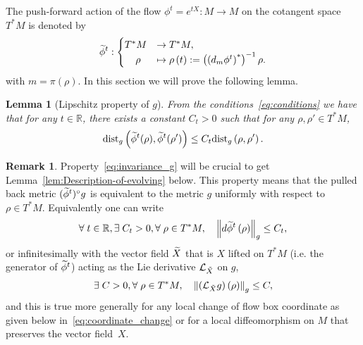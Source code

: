 \documentclass[10pt]{amsart}
\newtheorem{lemm}[theo]{Lemma}\newtheorem{prop}[theo]{Proposition}\newtheorem{coro}[theo]{Corollary}\newtheorem{conj}[theo]{Conjecture}
\theoremstyle{definition}\newtheorem{defi}[theo]{Definition}\newtheorem{rema}[theo]{Remark}\newtheorem{exam}[theo]{Example}\newtheorem{exem}[theo]{Example}\newtheorem{nota}[theo]{Notation}
\newcommand{\clL}{\mathcal{L}}
\newcommand{\dist}{\mathrm{dist}}
\newcommand{\bbR}{\mathbb{R}}
\let\oldtilde\tilde
\renewcommand*{\tilde}[1]{\mathchoice{\widetilde{#1}}{\widetilde{#1}}{\oldtilde{#1}}{\oldtilde{#1}}}
\let\oldexists\exists
\renewcommand*{\exists}{\mathrel{\oldexists}}
\let\oldforall\forall
\renewcommand*{\forall}{\mathrel{\oldforall}}
\begin{document}
The push-forward action of the flow $\phi^{t}=e^{tX}:M\rightarrow M$ on the cotangent space $T^{*}M$ is denoted by
\begin{equation}\label{eq:lifted_flow}
\tilde{\phi}^{t}:
\begin{cases}
T^{*}M & \rightarrow T^{*}M,\\
\mkern20mu\rho & \mapsto\rho\left(t\right):=\left(\left(d_{m}\phi^{t}\right)^{*}\right)^{-1}\rho.
\end{cases}
\end{equation}
with $m=\pi(\rho)$. In this section we will prove the following lemma.

\begin{cBoxB}{}
\begin{lemm}[Lipschitz property of $g$]\label{lem:Lipschitz_property}
From the conditions~\eqref{eq:conditions} we have that for any $t\in\bbR$, there exists a constant $C_{t}>0$ such that for any $\rho,\rho'\in T^{*}M$,
\begin{equation}\label{eq:invariance_g}
\dist_{g}\left(\tilde{\phi}^{t}(\rho),\tilde{\phi}^{t}(\rho')\right)\le C_{t}\dist_{g}\left(\rho,\rho'\right).
\end{equation}
\end{lemm}
\end{cBoxB}

\begin{rema}
Property~\eqref{eq:invariance_g} will be crucial to get Lemma~\ref{lem:Description-of-evolving} below. This property means that the pulled back metric $(\tilde{\phi}^{t})^{\circ}g$ is equivalent to the metric $g$ uniformly with respect to $\rho\in T^{*}M$. Equivalently one can write
\[
\forall t\in\bbR,\exists C_{t}>0,\forall\rho\in T^{*}M,\quad\left\Vert d\tilde{\phi}^{t}\left(\rho\right)\right\Vert _{g}\leq C_{t},
\]
or infinitesimally with the vector field $\tilde{X}$ that is $X$ lifted on $T^{*}M$ (i.e. the generator of $\tilde{\phi}^{t}$) acting as the Lie derivative $\clL_{\tilde{X}}$ on $g$,
\[
\exists C>0,\forall\rho\in T^{*}M,\quad\left\Vert \left(\clL_{\tilde{X}}g\right)\left(\rho\right)\right\Vert _{g}\leq C,
\]
and this is true more generally for any local change of flow box coordinate as given below in~\eqref{eq:coordinate_change} or for a local diffeomorphism on $M$ that preserves the vector field~$X$.
\end{rema}
\end{document}
